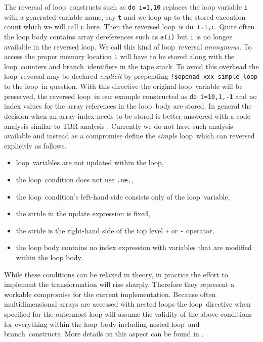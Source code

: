 \documentclass{book}
\newcommand{\Loop}{loop}
\newcommand{\branch}{branch}
\newcommand{\code}[1]{{\small\tt{#1}}}
\begin{document}
The reversal of  \Loop\ constructs such as \code{do i=1,10} replaces 
the loop variable \code{i} with a generated variable name, say \code{t} and we 
loop up to  the stored execution count which we will call  \code{c} here. 
Then the reversed \Loop\ is \code{do t=1,c}. Quite often the loop body contains 
array dereferences such as \code{a(i)} but \code{i} is no longer available in the 
reversed \Loop. We call this kind of \Loop\ reversal {\em anonymous}. 
To access the proper memory location \code{i} will have to be stored along with the 
\Loop\ counters and \branch\ identifiers in the tape stack.
To avoid this overhead the \Loop\ reversal may be declared {\em explicit}
by prepending \code{!\$openad xxx simple loop} to the \Loop\ in question. 
With this directive the original \Loop\ variable will be preserved,  
the reversed \Loop\ in our example constructed as \code{do i=10,1,-1} and 
no index values for the array references in the \Loop\ body are stored. 
In general the decision when an array index needs to be stored is better answered 
with a code analysis similar to TBR analysis \cite{HNP02}. 
Currently we do not have such  analysis available and instead 
as a compromise define the {\em simple}
\Loop\ which can reversed explicitly as follows. 
\begin{itemize}
  \parskip = -2pt
\item \Loop\ variables are not updated within the loop,
\item the \Loop\ condition does not use \code{.ne.},
\item the \Loop\ condition's left-hand side consists only of the \Loop\ variable,
\item the stride in the update expression is fixed,
\item the stride is the right-hand side of the top level \code{+} or \code{-} operator,
\item the loop body contains no index expression with variables that are modified within the loop body.
\end{itemize}
While these conditions can be relaxed in theory, in practice the effort to implement 
the transformation will rise sharply. Therefore they represent a workable compromise 
for the current implementation. 
Because often multidimensional arrays  are accessed with nested loops the 
\Loop\ directive when specified for the outermost loop will assume the validity 
of the above conditions for everything within the \Loop\ body including nested 
\Loop\ and \branch\ constructs. More details on this aspect can be found in 
\cite{UtLy05ERIF}. 
\end{document}
